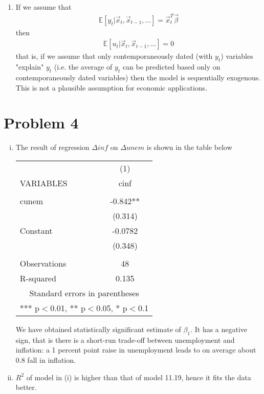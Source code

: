 \documentclass[a4paper]{article}
\newcommand{\expect}{\mathbb{E}}
\begin{document}
\begin{enumerate}
	\item If we assume that 
	\begin{align*}
	\expect[y_t|\vec{x}_t, \vec{x}_{t-1}, \dots] = \vec{x}_t^T\vec{\beta}
	\end{align*}
	then
	\begin{align*}
	\expect[u_t|\vec{x}_t, \vec{x}_{t-1}, \dots] = 0
	\end{align*}
	that is, if we assume that only contemporaneously dated (with $y_t$) variables "explain" $y_t$ (i.e. the average of $y_t$ can be predicted based only on contemporaneously dated variables) then the model is sequentially exogenous. This is not a plausible assumption for economic applications.
\end{enumerate}
	\section*{Problem 4}
	\begin{enumerate}[(i)]
		\item The result of regression $\Delta inf$ on $\Delta unem$ is shown in the table below
		
		\begin{center}
		\begin{tabular}{lc} \hline
			& (1) \\
			VARIABLES & cinf \\ \hline
			&  \\
			cunem & -0.842** \\
			& (0.314) \\
			Constant & -0.0782 \\
			& (0.348) \\
			&  \\
			Observations & 48 \\
			R-squared & 0.135 \\ \hline
			\multicolumn{2}{c}{ Standard errors in parentheses} \\
			\multicolumn{2}{c}{ *** p$<$0.01, ** p$<$0.05, * p$<$0.1} \\
		\end{tabular}
	\end{center}
	We have obtained statistically significant estimate of $\beta_1$. It has a negative sign, that is there is a short-run trade-off between unemployment and inflation: a 1 percent point raise in unemployment leads to on average about 0.8 fall in inflation.
	\item $R^2$ of model in (i) is higher than that of model 11.19, hence it fits the data better.
	\end{enumerate}
\end{document}
